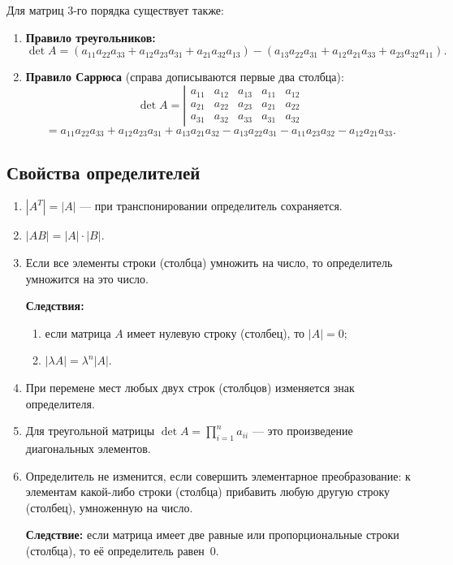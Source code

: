 \documentclass[a4paper, 12pt]{article}
\begin{document}
Для матриц 3-го порядка существует также:
\begin{enumerate}[label=\arabic*)]
  \item \textbf{Правило треугольников:}
    \[
      \det A = (a_{11} a_{22} a_{33} + a_{12} a_{23} a_{31} + a_{21} a_{32} a_{13})
             - (a_{13} a_{22} a_{31} + a_{12} a_{21} a_{33} + a_{23} a_{32} a_{11}).
    \]
  \item \textbf{Правило Саррюса} (справа дописываются первые два столбца):
    \[
      \det A =
      \left|\begin{array}{ccc|cc}
        a_{11} & a_{12} & a_{13} & a_{11} & a_{12} \\
        a_{21} & a_{22} & a_{23} & a_{21} & a_{22} \\
        a_{31} & a_{32} & a_{33} & a_{31} & a_{32}
      \end{array}\right.
    \]
    \[
      = a_{11} a_{22} a_{33} + a_{12} a_{23} a_{31} + a_{13} a_{21} a_{32}
      - a_{13} a_{22} a_{31} - a_{11} a_{23} a_{32} - a_{12} a_{21} a_{33}.
    \]
\end{enumerate}

\subsection{Свойства определителей}

\begin{enumerate}[label=\arabic*)]
  \item $|A^T| = |A|$ --- при транспонировании определитель сохраняется.
  \item $|AB| = |A| \cdot |B|$.
  \item Если все элементы строки (столбца) умножить на число, то определитель
    умножится на это число.

    \textbf{Следствия:}
    \begin{enumerate}[label=\alph*)]
      \item если матрица $A$ имеет нулевую строку (столбец), то $|A| = 0$;
      \item $|\lambda A| = \lambda^n |A|$.
    \end{enumerate}
  \item При перемене мест любых двух строк (столбцов) изменяется знак
    определителя.
  \item Для треугольной матрицы $\det A = \prod\limits_{i=1}^{n} a_{ii}$ ---
    это произведение диагональных элементов.
  \item Определитель не изменится, если совершить элементарное преобразование:
    к элементам какой-либо строки (столбца) прибавить любую другую строку
    (столбец), умноженную на число.

    \textbf{Следствие:} если матрица имеет две равные или пропорциональные
    строки (столбца), то её определитель равен~0.
\end{enumerate}
\end{document}
